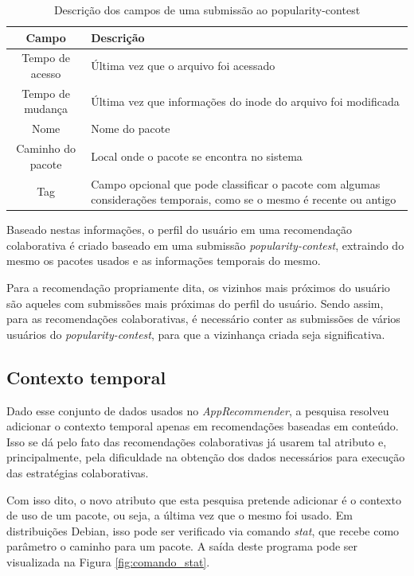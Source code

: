 \begin{table}[h!]
\centering
\newcommand\T{\rule{0pt}{2.8ex}}
\newcommand\B{\rule[-1.8ex]{0pt}{0pt}}
\begin{tabularx}{15cm}{| c | X |}
\hline
\rowcolor[HTML]{EFEFEF}
{\textbf{Campo}} & \textbf{Descrição} \\ \hline
{Tempo de acesso}  & Última vez que o arquivo foi acessado \\ \hline
{Tempo de mudança}   & Última vez que informações do inode do arquivo foi
                       modificada\\ \hline
{Nome}   & Nome do pacote                  \\ \hline
{Caminho do pacote}   & Local onde o pacote se encontra no sistema \\ \hline
{Tag}   & Campo opcional que pode classificar o pacote com algumas considerações
temporais, como se o mesmo é recente ou antigo\\ \hline
\end{tabularx}
\caption{Descrição dos campos de uma submissão ao popularity-contest}
\label{tab:submissao_popcon}
\end{table}

Baseado nestas informações, o perfil do usuário em uma recomendação colaborativa
é criado baseado em uma submissão \textit{popularity-contest}, extraindo do mesmo os pacotes usados e
as informações temporais do mesmo.

Para a recomendação propriamente dita, os vizinhos mais próximos do usuário são
aqueles com submissões mais próximas do perfil do usuário. Sendo assim, para as
recomendações colaborativas, é necessário conter as submissões de vários
usuários do \textit{popularity-contest}, para que a vizinhança criada seja significativa.

\subsection{Contexto temporal} \label{sec:contexto_temporal}

Dado esse conjunto de dados usados no \textit{AppRecommender}, a pesquisa resolveu
adicionar o contexto temporal apenas em recomendações baseadas em conteúdo. Isso
se dá pelo fato das recomendações colaborativas já usarem tal atributo e,
principalmente, pela dificuldade na obtenção dos dados necessários para execução
das estratégias colaborativas.

Com isso dito, o novo atributo que esta pesquisa pretende
adicionar é o contexto de uso de um pacote, ou seja, a última vez que o
mesmo foi usado. Em distribuições Debian, isso pode ser verificado via comando
\textit{stat}, que recebe como parâmetro o caminho para um pacote.
A saída deste programa pode ser visualizada na Figura \ref{fig:comando_stat}.

